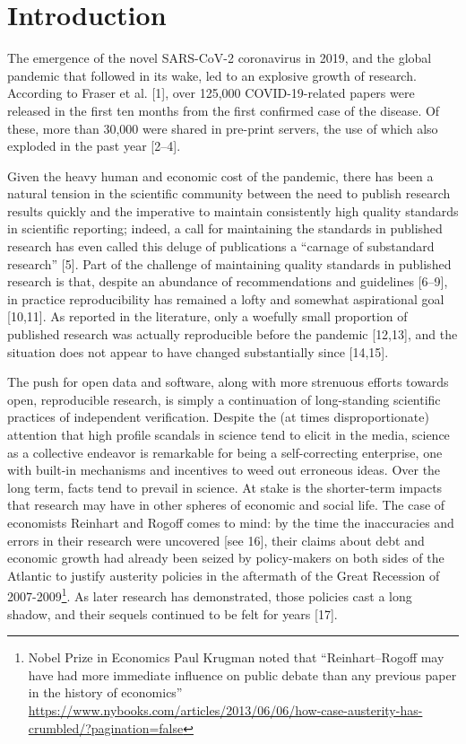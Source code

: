 \documentclass[10pt,letterpaper]{article}
\begin{document}
\linenumbers

\hypertarget{introduction}{%
\section{Introduction}\label{introduction}}

The emergence of the novel SARS-CoV-2 coronavirus in 2019, and the
global pandemic that followed in its wake, led to an explosive growth of
research. According to Fraser et al. {[}1{]}, over 125,000
COVID-19-related papers were released in the first ten months from the
first confirmed case of the disease. Of these, more than 30,000 were
shared in pre-print servers, the use of which also exploded in the past
year {[}2--4{]}.

Given the heavy human and economic cost of the pandemic, there has been
a natural tension in the scientific community between the need to
publish research results quickly and the imperative to maintain
consistently high quality standards in scientific reporting; indeed, a
call for maintaining the standards in published research has even called
this deluge of publications a ``carnage of substandard research''
{[}5{]}. Part of the challenge of maintaining quality standards in
published research is that, despite an abundance of recommendations and
guidelines {[}6--9{]}, in practice reproducibility has remained a lofty
and somewhat aspirational goal {[}10,11{]}. As reported in the
literature, only a woefully small proportion of published research was
actually reproducible before the pandemic {[}12,13{]}, and the situation
does not appear to have changed substantially since {[}14,15{]}.

The push for open data and software, along with more strenuous efforts
towards open, reproducible research, is simply a continuation of
long-standing scientific practices of independent verification. Despite
the (at times disproportionate) attention that high profile scandals in
science tend to elicit in the media, science as a collective endeavor is
remarkable for being a self-correcting enterprise, one with built-in
mechanisms and incentives to weed out erroneous ideas. Over the long
term, facts tend to prevail in science. At stake is the shorter-term
impacts that research may have in other spheres of economic and social
life. The case of economists Reinhart and Rogoff comes to mind: by the
time the inaccuracies and errors in their research were uncovered {[}see
16{]}, their claims about debt and economic growth had already been
seized by policy-makers on both sides of the Atlantic to justify
austerity policies in the aftermath of the Great Recession of
2007-2009\footnote{Nobel Prize in Economics Paul Krugman noted that
  ``Reinhart--Rogoff may have had more immediate influence on public
  debate than any previous paper in the history of economics''
  \url{https://www.nybooks.com/articles/2013/06/06/how-case-austerity-has-crumbled/?pagination=false}}.
As later research has demonstrated, those policies cast a long shadow,
and their sequels continued to be felt for years {[}17{]}.
\end{document}
